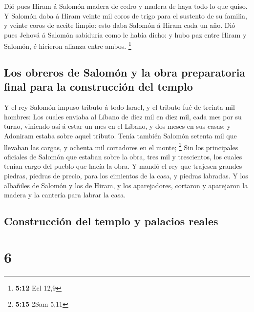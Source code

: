  Dió pues Hiram á Salomón madera de cedro y madera de
haya todo lo que quiso.  Y Salomón daba á Hiram veinte
mil coros de trigo para el sustento de su familia, y veinte coros de
aceite limpio: esto daba Salomón á Hiram cada un año. 
Dió pues Jehová á Salomón sabiduría como le había dicho: y hubo paz
entre Hiram y Salomón, é hicieron alianza entre ambos. \footnote{\textbf{5:12}
  Ecl 12,9}

\hypertarget{los-obreros-de-salomuxf3n-y-la-obra-preparatoria-final-para-la-construcciuxf3n-del-templo}{%
\subsection{Los obreros de Salomón y la obra preparatoria final para la
construcción del
templo}\label{los-obreros-de-salomuxf3n-y-la-obra-preparatoria-final-para-la-construcciuxf3n-del-templo}}

 Y el rey Salomón impuso tributo á todo Israel, y el
tributo fué de treinta mil hombres:  Los cuales enviaba
al Líbano de diez mil en diez mil, cada mes por su turno, viniendo así á
estar un mes en el Líbano, y dos meses en sus casas: y Adoniram estaba
sobre aquel tributo.  Tenía también Salomón setenta mil
que llevaban las cargas, y ochenta mil cortadores en el monte;
\footnote{\textbf{5:15} 2Sam 5,11}  Sin los principales
oficiales de Salomón que estaban sobre la obra, tres mil y trescientos,
los cuales tenían cargo del pueblo que hacía la obra.  Y
mandó el rey que trajesen grandes piedras, piedras de precio, para los
cimientos de la casa, y piedras labradas.  Y los
albañiles de Salomón y los de Hiram, y los aparejadores, cortaron y
aparejaron la madera y la cantería para labrar la casa.

\hypertarget{construcciuxf3n-del-templo-y-palacios-reales}{%
\subsection{Construcción del templo y palacios
reales}\label{construcciuxf3n-del-templo-y-palacios-reales}}

\hypertarget{section-5}{%
\section{6}\label{section-5}}

